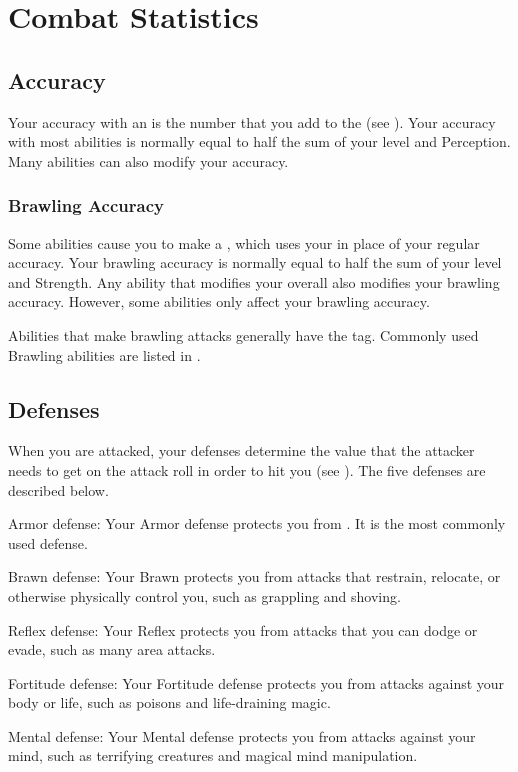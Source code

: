 \section{Combat Statistics}\label{Combat Statistics}

  \subsection{Accuracy}\label{Accuracy}
    Your accuracy with an  is the number that you add to the  (see ).
    Your accuracy with most abilities is normally equal to half the sum of your level and Perception.
    Many abilities can also modify your accuracy.

    \subsubsection{Brawling Accuracy}\label{Brawling Accuracy}
      Some abilities cause you to make a , which uses your  in place of your regular accuracy.
      Your brawling accuracy is normally equal to half the sum of your level and Strength.
      Any ability that modifies your overall  also modifies your brawling accuracy.
      However, some abilities only affect your brawling accuracy.

      Abilities that make brawling attacks generally have the \atBrawling tag.
      Commonly used Brawling abilities are listed in .

  \subsection{Defenses}\label{Defenses}
    When you are attacked, your defenses determine the value that the attacker needs to get on the attack roll in order to hit you (see ).
    The five defenses are described below.
    \begin{raggeditemize}
      \item Armor defense: Your Armor defense protects you from .
        It is the most commonly used defense.
      \item Brawn defense: Your Brawn protects you from attacks that restrain, relocate, or otherwise physically control you, such as grappling and shoving.
      \item Reflex defense: Your Reflex protects you from attacks that you can dodge or evade, such as many area attacks.
      \item Fortitude defense: Your Fortitude defense protects you from attacks against your body or life, such as poisons and life-draining magic.
      \item Mental defense: Your Mental defense protects you from attacks against your mind, such as terrifying creatures and magical mind manipulation.
    \end{raggeditemize}

